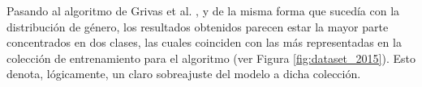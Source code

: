 \bigskip
\begin{table}[H]
	\centering
	\caption{Distribución de edad obtenida por el algoritmo de Martinc et al. \cite{martinc2019hot}}
	\label{tab:comparativa_edad_martinc}
\end{table}

\bigskip
Pasando al algoritmo de Grivas et al. \cite{grivas2015author}, y de la misma forma que sucedía con la distribución de género, los resultados obtenidos
parecen estar la mayor parte concentrados en dos clases, las cuales coinciden con las más representadas en la colección de entrenamiento para el algoritmo (ver Figura \ref{fig:dataset_2015}).
Esto denota, lógicamente, un claro sobreajuste del modelo a dicha colección. 

